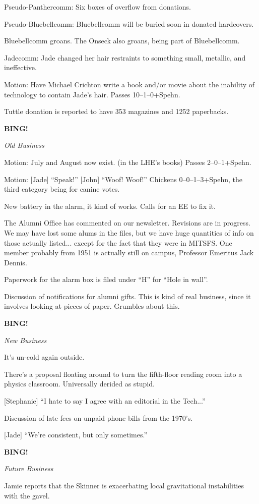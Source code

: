 \documentclass[12pt]{article}
\newcommand{\bing}{{\bf BING!} }
\newcommand{\goto}[1]{\bing \vskip 12pt \centerline{{\em{#1}}}}
\begin{document}
Pseudo-Panthercomm: Six boxes of overflow from donations.

Pseudo-Bluebellcomm: Bluebellcomm will be buried soon in donated
hardcovers.

Bluebellcomm groans.  The Onseck also groans, being part of Bluebellcomm.

Jadecomm: Jade changed her hair restraints to something small, metallic,
and ineffective.

Motion: Have Michael Crichton write a book and/or movie about the
inability of technology to contain Jade's hair.  Passes 10--1--0+Spehn.

Tuttle donation is reported to have 353 magazines and 1252 paperbacks.

\goto{Old Business}

Motion: July and August now exist.  (in the LHE's books)  Passes
2--0--1+Spehn.

Motion: [Jade] ``Speak!''  [John] ``Woof!  Woof!''  Chickens
0--0--1--3+Spehn, the third category being for canine votes.

New battery in the alarm, it kind of works.  Calls for an EE to fix it.

The Alumni Office has commented on our newsletter.  Revisions are in
progress.  We may have lost some alums in the files, but we have huge
quantities of info on those actually listed... except for the fact that
they were in MITSFS.  One member probably from 1951 is actually still
on campus, Professor Emeritus Jack Dennis.

Paperwork for the alarm box is filed under ``H'' for ``Hole in wall''.

Discussion of notifications for alumni gifts.  This is kind of real
business, since it involves looking at pieces of paper.  Grumbles
about this.

\goto{New Business}

It's un-cold again outside.

There's a proposal floating around to turn the fifth-floor reading
room into a physics classroom.  Universally derided as stupid.

[Stephanie] ``I hate to say I agree with an editorial in the Tech...''

Discussion of late fees on unpaid phone bills from the 1970's.

[Jade] ``We're consistent, but only sometimes.''

\goto{Future Business}

Jamie reports that the Skinner is exacerbating local gravitational
instabilities with the gavel.
\end{document}
